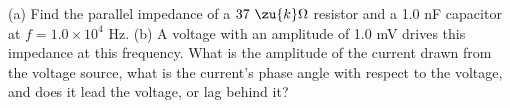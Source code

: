         (a) Find the parallel impedance of a $37\ \zu{k}\Omega$ resistor and
        a 1.0 nF capacitor at $f=1.0\times10^4$ Hz.\answercheck\hwendpart
        (b) A voltage with an amplitude of 1.0 mV drives this impedance at this
        frequency. What is the amplitude of the current drawn from the
        voltage source,  what is the current's phase angle with respect to the
        voltage, and does it lead the voltage, or lag behind it?\answercheck

